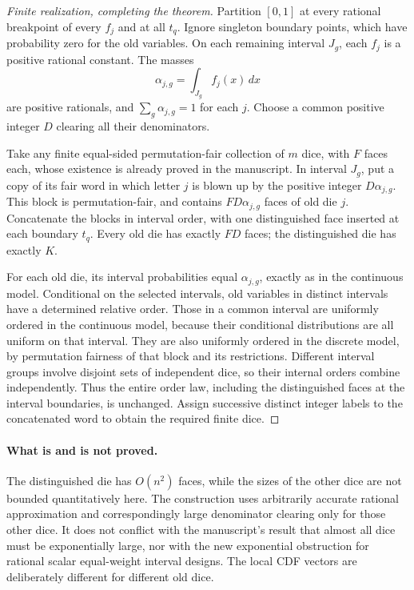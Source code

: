 \documentclass[11pt]{article}
\begin{document}
\begin{proof}[Finite realization, completing the theorem]
Partition $[0,1]$ at every rational breakpoint of every $f_j$ and at all
$t_q$. Ignore singleton boundary points, which have probability zero for
the old variables. On each remaining interval $J_g$, each $f_j$ is a
positive rational constant. The masses
\[
 \alpha_{j,g}=\int_{J_g}f_j(x)\,dx
\]
are positive rationals, and $\sum_g\alpha_{j,g}=1$ for each $j$.
Choose a common positive integer $D$ clearing all their denominators.

Take any finite equal-sided permutation-fair collection of $m$ dice,
with $F$ faces each, whose existence is already proved in the manuscript.
In interval $J_g$, put a copy of its fair word in which letter $j$ is
blown up by the positive integer $D\alpha_{j,g}$. This block is
permutation-fair, and contains $FD\alpha_{j,g}$ faces of old die $j$.
Concatenate the blocks in interval order, with one distinguished face
inserted at each boundary $t_q$. Every old die has exactly $FD$ faces;
the distinguished die has exactly $K$.

For each old die, its interval probabilities equal $\alpha_{j,g}$,
exactly as in the continuous model. Conditional on the selected intervals,
old variables in distinct intervals have a determined relative order.
Those in a common interval are uniformly ordered in the continuous model,
because their conditional distributions are all uniform on that interval.
They are also uniformly ordered in the discrete model, by permutation
fairness of that block and its restrictions. Different interval groups
involve disjoint sets of independent dice, so their internal orders combine
independently. Thus the entire order law, including the distinguished
faces at the interval boundaries, is unchanged. Assign successive distinct
integer labels to the concatenated word to obtain the required finite dice.
\end{proof}

\paragraph{What is and is not proved.}
The distinguished die has $O(n^2)$ faces, while the sizes of the other
dice are not bounded quantitatively here. The construction uses arbitrarily
accurate rational approximation and correspondingly large denominator
clearing only for those other dice. It does not conflict with the manuscript's
result that almost all dice must be exponentially large, nor with the new
exponential obstruction for rational scalar equal-weight interval designs.
The local CDF vectors are deliberately different for different old dice.
\end{document}
